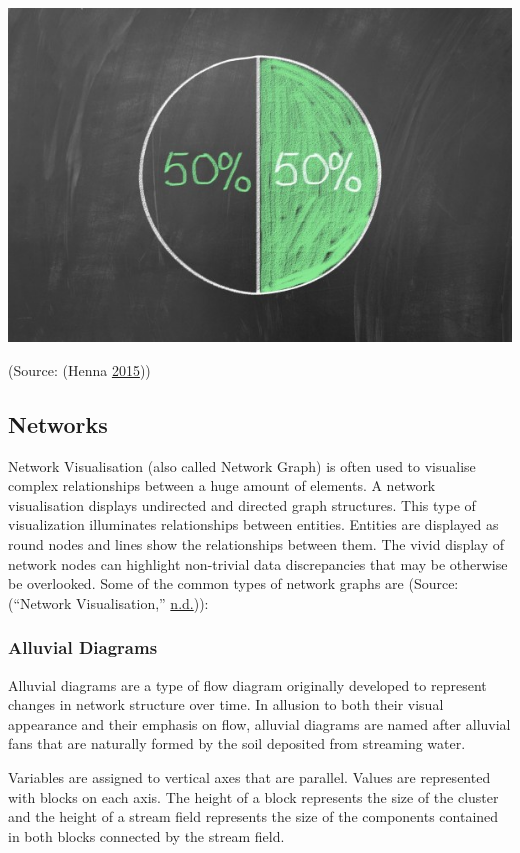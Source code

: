 \documentclass[]{book}
\begin{document}
\includegraphics{images/50-50-pretty.jpg}

(Source: (Henna \protect\hyperlink{ref-50-percent-Henna-Chai}{2015}))

\hypertarget{networks}{%
\subsection{Networks}\label{networks}}

Network Visualisation (also called Network Graph) is often used to visualise complex relationships between a huge amount of elements. A network visualisation displays undirected and directed graph structures. This type of visualization illuminates relationships between entities. Entities are displayed as round nodes and lines show the relationships between them. The vivid display of network nodes can highlight non-trivial data discrepancies that may be otherwise be overlooked. Some of the common types of network graphs are (Source: (``Network Visualisation,'' \protect\hyperlink{ref-networks}{n.d.})):

\hypertarget{alluvial-diagrams}{%
\subsubsection{Alluvial Diagrams}\label{alluvial-diagrams}}

Alluvial diagrams are a type of flow diagram originally developed to represent changes in network structure over time. In allusion to both their visual appearance and their emphasis on flow, alluvial diagrams are named after alluvial fans that are naturally formed by the soil deposited from streaming water.

Variables are assigned to vertical axes that are parallel. Values are represented with blocks on each axis. The height of a block represents the size of the cluster and the height of a stream field represents the size of the components contained in both blocks connected by the stream field.
\end{document}
